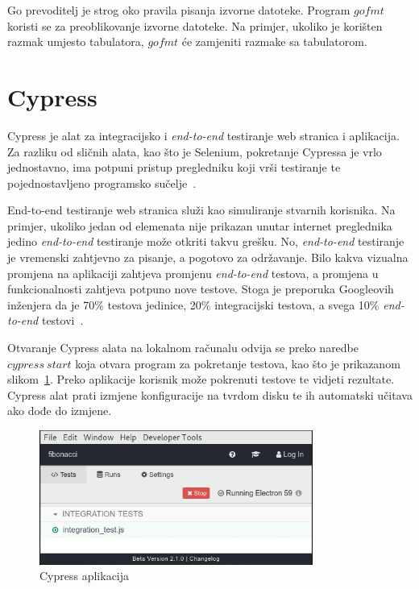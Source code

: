 Go prevoditelj je strog oko pravila pisanja izvorne datoteke. Program $gofmt$ koristi se za
preoblikovanje izvorne datoteke. Na primjer, ukoliko je korišten razmak umjesto tabulatora, $gofmt$
će zamjeniti razmake sa tabulatorom.

\section{Cypress}
Cypress je alat za integracijsko i \textit{end-to-end} testiranje web stranica i aplikacija. Za
razliku od sličnih alata, kao što je Selenium, pokretanje Cypressa je vrlo jednostavno, ima potpuni
pristup pregledniku koji vrši testiranje te pojednostavljeno programsko sučelje~\citep{Cypress}.

End-to-end testiranje web stranica služi kao simuliranje stvarnih korisnika. Na primjer, ukoliko
jedan od elemenata nije prikazan unutar internet preglednika jedino \textit{end-to-end} testiranje
može otkriti takvu grešku. No, \textit{end-to-end} testiranje je vremenski zahtjevno za pisanje, a
pogotovo za održavanje. Bilo kakva vizualna promjena na aplikaciji zahtjeva promjenu
\textit{end-to-end} testova, a promjena u funkcionalnosti zahtjeva potpuno nove testove. Stoga je
preporuka Googleovih inženjera da je 70\% testova jedinice, 20\% integracijski testova, a svega 10\%
\textit{end-to-end} testovi~\citep{google-2015}.

Otvaranje Cypress alata na lokalnom računalu odvija se preko naredbe $cypress~start$ koja otvara
program za pokretanje testova, kao što je prikazanom slikom~\ref{fig:02cypress}. Preko aplikacije
korisnik može pokrenuti testove te vidjeti rezultate. Cypress alat prati izmjene konfiguracije na
tvrdom disku te ih automatski učitava ako dođe do izmjene.

\begin{figure}[h]
    \centering
    \includegraphics[width=0.8\textwidth]{img/02/cypress.png}
    \caption{Cypress aplikacija}%
    \label{fig:02cypress}
\end{figure}

